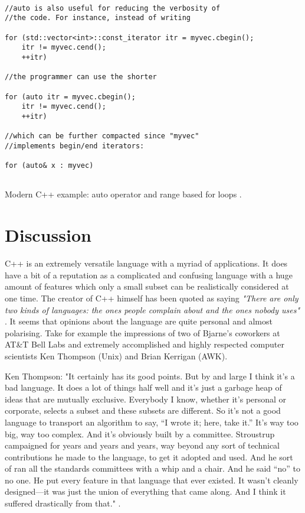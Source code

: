 \documentclass[conference, a4paper]{IEEEtran}
\begin{document}
\begin{listing}[h]
\begin{verbatim}

//auto is also useful for reducing the verbosity of
//the code. For instance, instead of writing

for (std::vector<int>::const_iterator itr = myvec.cbegin();
    itr != myvec.cend();
    ++itr)

//the programmer can use the shorter

for (auto itr = myvec.cbegin();
    itr != myvec.cend();
    ++itr)

//which can be further compacted since "myvec"
//implements begin/end iterators:

for (auto& x : myvec)
        
    \end{verbatim}

    \caption{Modern C++ example: auto operator and range based for loops \cite{C++11_2021}. }
\label{listing:3}
\end{listing}


\section{Discussion}

C++ is an extremely versatile language with a myriad of applications. It does have a bit of a reputation as a complicated and confusing language with a huge amount of features which only a small subset can be realistically considered at one time. The creator of C++ himself has been quoted as saying \textit{"There are only two kinds of languages: the ones people complain about and the ones nobody uses"} \cite{cppquotes}. It seems that opinions about the language are quite personal and almost polarising. Take for example the impressions of two of Bjarne's coworkers at AT\&T Bell Labs and extremely accomplished and highly respected computer scientists Ken Thompson (Unix) and Brian Kerrigan (AWK). 

Ken Thompson:
"It certainly has its good points. But by and large I think it’s a bad language. It does a lot of things half well and it’s just a garbage heap of ideas that are mutually exclusive. Everybody I know, whether it’s personal or corporate, selects a subset and these subsets are different. So it’s not a good language to transport an algorithm to say, “I wrote it; here, take it.” It’s way too big, way too complex. And it’s obviously built by a committee. Stroustrup campaigned for years and years and years, way beyond any sort of technical contributions he made to the language, to get it adopted and used. And he sort of ran all the standards committees with a whip and a chair. And he said “no” to no one. He put every feature in that language that ever existed. It wasn’t cleanly designed—it was just the union of everything that came along. And I think it suffered drastically from that." \cite{Seibel_2009}.
\end{document}
